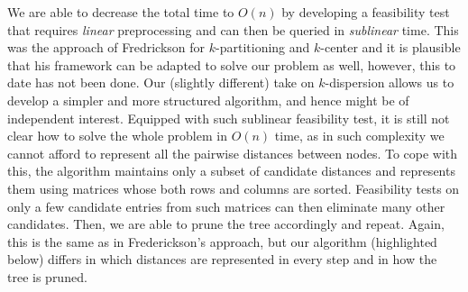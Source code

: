 \documentclass[a4paper,UKenglish]{lipics-v2016}
\theoremstyle{plain}
\begin{document}
\medskip {}
We are able to decrease the total time to $O(n)$ by
developing a feasibility test that requires {\em linear} preprocessing and can then be queried in \emph{sublinear} time. This was the approach of Fredrickson for $k$-partitioning and $k$-center and it is plausible that his framework can be adapted to solve our problem as well,
however, this to date has not been done. Our (slightly different) take on $k$-dispersion allows us to develop a  simpler and more structured algorithm, and hence might be of independent interest.
Equipped with such sublinear feasibility test, it is still not clear how to solve the whole problem in $O(n)$ time, as in such complexity we cannot afford to represent all the pairwise
distances between nodes. To cope with this, the algorithm maintains %
only a subset of candidate distances and represents them using matrices whose both rows and columns are sorted.  Feasibility tests on only a few candidate entries from 
such matrices can then eliminate many other candidates. Then, we are able to prune the tree accordingly and repeat.
Again, this is the same as in Frederickson's approach, but our algorithm (highlighted below) differs in which distances are represented in every step and in how the tree is pruned. 
\end{document}
